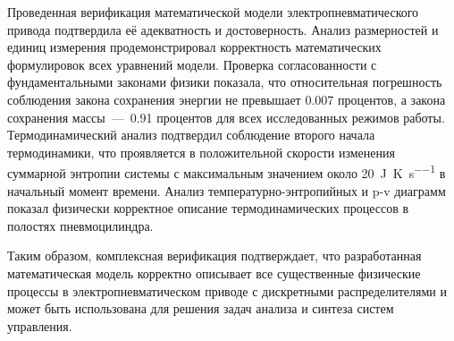 Проведенная верификация математической модели электропневматического привода подтвердила её адекватность и достоверность.
Анализ размерностей и единиц измерения продемонстрировал корректность математических формулировок всех уравнений модели.
Проверка согласованности с фундаментальными законами физики показала, что относительная погрешность соблюдения
закона сохранения энергии не превышает \num{0.007} процентов, а закона сохранения массы~---~\num{0.91} процентов
для всех исследованных режимов работы.
Термодинамический анализ подтвердил соблюдение второго начала термодинамики,
что проявляется в положительной скорости изменения суммарной энтропии системы с максимальным значением
около \SI{20}{\joule\per\kelvin\per\second} в начальный момент времени. Анализ температурно-энтропийных
и p-v диаграмм показал физически корректное описание термодинамических процессов в полостях пневмоцилиндра.

Таким образом, комплексная верификация подтверждает, что разработанная математическая модель
корректно описывает все существенные физические процессы в электропневматическом приводе с
дискретными распределителями и может быть использована для решения задач анализа и синтеза систем управления.
